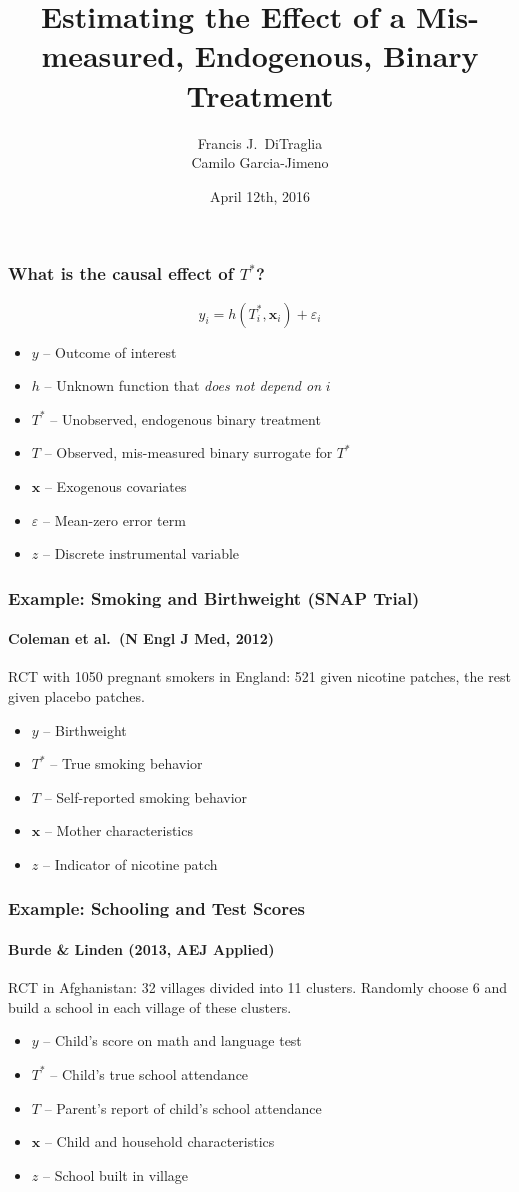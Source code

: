 \documentclass{beamer}
\title[Binary Regressors]{Estimating the Effect of a Mis-measured, Endogenous, Binary Treatment}
\author[FJ DiTraglia]{Francis J.\ DiTraglia\\ Camilo Garcia-Jimeno}
\institute{University of Pennsylvania}
\date{April 12th, 2016}
\begin{document}
 

\begin{frame}[plain]
	\titlepage 
\end{frame} 
\begin{frame}
  \frametitle{What is the causal effect of $T^*$?}
  \[ y_i = h(T^*_i, \mathbf{x}_i) + \varepsilon_i\]
  \begin{itemize}
    \item $y$ -- Outcome of interest
    \item $h$ -- Unknown function that \emph{does not depend on} $i$
    \item $T^*$ -- Unobserved, endogenous binary treatment
    \item $T$ -- Observed, mis-measured binary surrogate for $T^*$
    \item $\mathbf{x}$ -- Exogenous covariates
    \item $\varepsilon$ -- Mean-zero error term
    \item $z$ -- Discrete instrumental variable
  \end{itemize}
\end{frame}
\begin{frame}
  \frametitle{Example: Smoking and Birthweight (SNAP Trial)}
\framesubtitle{Coleman et al.\ (N Engl J Med, 2012)}
  RCT with 1050 pregnant smokers in England: 521 given nicotine patches, the rest given placebo patches.
\begin{itemize}
  \item $y$ -- Birthweight 
  \item $T^*$ -- True smoking behavior 
  \item $T$ -- Self-reported smoking behavior
  \item $\mathbf{x}$ -- Mother characteristics
  \item $z$ -- Indicator of nicotine patch
\end{itemize}
   
\end{frame}
\begin{frame}
  \frametitle{Example: Schooling and Test Scores}
\framesubtitle{Burde \& Linden (2013, AEJ Applied)}
  RCT in Afghanistan: 32 villages divided into 11 clusters. Randomly choose 6 and build a school in each village of these clusters.

\begin{itemize}
  \item $y$ -- Child's score on math and language test 
  \item $T^*$ -- Child's true school attendance
  \item $T$ -- Parent's report of child's school attendance
  \item $\mathbf{x}$ -- Child and household characteristics
  \item $z$ -- School built in village
\end{itemize}
\end{frame}
\end{document}
